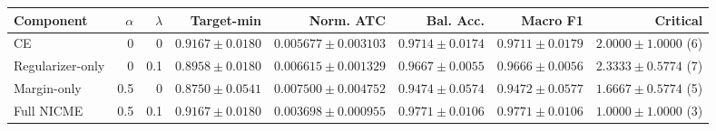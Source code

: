 \begin{tabular}{lrrrrrrr}
\toprule
Component & $\alpha$ & $\lambda$ & Target-min & Norm. ATC & Bal. Acc. & Macro F1 & Critical \\
\midrule
CE & 0 & 0 & $0.9167 \pm 0.0180$ & $0.005677 \pm 0.003103$ & $0.9714 \pm 0.0174$ & $0.9711 \pm 0.0179$ & $2.0000 \pm 1.0000$ (6) \\
Regularizer-only & 0 & 0.1 & $0.8958 \pm 0.0180$ & $0.006615 \pm 0.001329$ & $0.9667 \pm 0.0055$ & $0.9666 \pm 0.0056$ & $2.3333 \pm 0.5774$ (7) \\
Margin-only & 0.5 & 0 & $0.8750 \pm 0.0541$ & $0.007500 \pm 0.004752$ & $0.9474 \pm 0.0574$ & $0.9472 \pm 0.0577$ & $1.6667 \pm 0.5774$ (5) \\
Full NICME & 0.5 & 0.1 & $0.9167 \pm 0.0180$ & $0.003698 \pm 0.000955$ & $0.9771 \pm 0.0106$ & $0.9771 \pm 0.0106$ & $1.0000 \pm 1.0000$ (3) \\
\bottomrule
\end{tabular}
